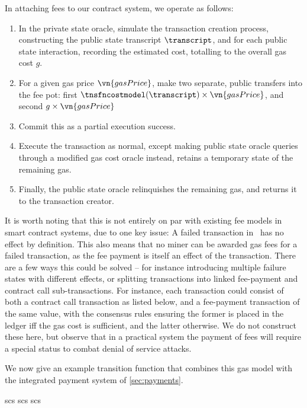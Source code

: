   In attaching fees to our contract system, we operate as follows:
  \begin{enumerate}
    \item In the private state oracle, simulate the transaction creation
      process, constructing the public state transcript $\transcript$, and for each public
      state interaction, recording the estimated cost, totalling to the overall
      gas cost $g$.
    \item For a given gas price $\vn{gasPrice}$, make two separate, public
      transfers into the fee pot: first $\tnsfncostmodel(\transcript) \times
      \vn{gasPrice}$, and second $g \times \vn{gasPrice}$
    \item Commit this as a partial execution success.
    \item Execute the transaction as normal, except making public state oracle
      queries through a modified gas cost oracle instead, retains a temporary
      state of the remaining gas.
    \item Finally, the public state oracle relinquishes the remaining gas, and
      returns it to the transaction creator.
  \end{enumerate}

It is worth noting that this is not entirely on par with existing fee models in
smart contract systems, due to one key issue: A failed transaction in \kachina\
has no effect by definition. This also means that no miner can be awarded gas
fees for a failed transaction, as the fee payment is itself an effect of the
transaction. There are a few ways this could be solved -- for instance
introducing multiple failure states with different effects, or splitting
transactions into linked fee-payment and contract call sub-transactions. For
instance, each transaction could consist of both a contract call transaction as
listed below, and a fee-payment transaction of the same value, with the
consensus rules ensuring the former is placed in the ledger iff the gas cost is
sufficient, and the latter otherwise. We do not construct these here, but
observe that in a practical system the payment of fees will require a special
status to combat denial of service attacks.

We now give an example transition function that combines this gas model with the
integrated payment system of \autoref{sec:payments}.

{scs}
{scs}
{scs}

